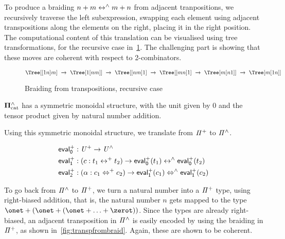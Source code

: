 To produce a braiding $n + m \mathrel{\leftrightarrow^{\wedge}} m + n$ from adjacent tranpositions, we recursively traverse the left subexpression,
swapping each element using adjacent transpositions along the elements on the right, placing it in the right position.
The computational content of this translation can be visualised using tree transformations, for the recursive case
in~\cref{fig:plusplusswap}. The challenging part is showing that these moves are coherent with respect to 2-combinators.

\begin{figure}
   \[
      \Tree [ [ {\tiny 1} {\tiny n} ] {\tiny m} ] ~\xrightarrow{}~
      \Tree [ {\tiny 1} [ {\tiny n} {\tiny m} ] ] ~\xrightarrow{}~
      \Tree [ [ {\tiny n} {\tiny m} ] {\tiny 1} ] ~\xrightarrow{}~
      \Tree [ [ {\tiny m} {\tiny n} ] {\tiny 1} ] ~\xrightarrow{}~
      \Tree [ {\tiny m} [ {\tiny n} {\tiny 1} ] ] ~\xrightarrow{}~
      \Tree [ {\tiny m} [ {\tiny 1} {\tiny n} ] ] ~
    \]
    \caption{Braiding from transpositions, recursive case}
    \label{fig:plusplusswap}
\end{figure}

\begin{lemma}
  $\mathbf{\Pi}^{\wedge}_{\mathrm{cat}}$ has a symmetric monoidal structure, with the unit given by 0 and the tensor product given by natural
  number addition.
\end{lemma}

\noindent Using this symmetric monoidal structure, we translate from $\mathit{{\Pi}^{+}}$ to $\mathit{{\Pi}^{\wedge}}$.

\begin{definition}[$\evalp$]
  \begin{align*}
    \evalp_{0} & : \UPlus \to \UHat                                                           \\
    \evalp_{1} & : (c : t_{1} \isop t_{2}) \to \evalp_{0}(t_{1}) \isoh \evalp_{0}(t_{2})      \\
    \evalp_{2} & : (\alpha : c_{1} \Isop c_{2}) \to \evalp_{1}(c_{1}) \Isoh \evalp_{1}(c_{2})
  \end{align*}
\end{definition}

To go back from $\mathit{{\Pi}^{\wedge}}$ to $\mathit{{\Pi}^{+}}$, we turn a natural number into a $\mathit{{\Pi}^{+}}$ type, using right-biased
addition, that is, the natural number $n$ gets mapped to the type $\onet + (\onet + (\onet + \ldots + \zerot))$. Since
the types are already right-biased, an adjacent transposition in $\mathit{{\Pi}^{\wedge}}$ is easily encoded by using the braiding in
$\mathit{{\Pi}^{+}}$, as shown in~\cref{fig:transpfrombraid}. Again, these are shown to be coherent.

